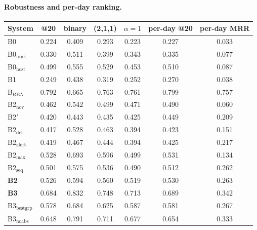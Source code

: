 \documentclass[10.5pt,a4paper]{article}
\begin{document}
\paragraph{Robustness and per-day ranking.}
\begin{center}\small
\begin{tabular}{@{}l cccccc@{}}
\toprule
System & @20 & binary & (2,1,1) & $\alpha = 1$ & per-day @20 & per-day MRR \\
\midrule
B0 & 0.224 & 0.409 & 0.293 & 0.223 & 0.227 & 0.033 \\
B0$_\mathrm{rank}$ & 0.330 & 0.511 & 0.399 & 0.343 & 0.335 & 0.077 \\
B0$_\mathrm{host}$ & 0.499 & 0.555 & 0.529 & 0.453 & 0.510 & 0.087 \\
B1 & 0.249 & 0.438 & 0.319 & 0.252 & 0.270 & 0.038 \\
B$_\mathrm{RBA}$ & 0.792 & 0.665 & 0.763 & 0.761 & 0.799 & 0.757 \\
B2$_\mathrm{nov}$ & 0.462 & 0.542 & 0.499 & 0.471 & 0.490 & 0.060 \\
B2$'$ & 0.420 & 0.443 & 0.435 & 0.425 & 0.449 & 0.209 \\
B2$_\mathrm{def}$ & 0.417 & 0.528 & 0.463 & 0.394 & 0.423 & 0.151 \\
B2$_\mathrm{alert}$ & 0.419 & 0.467 & 0.444 & 0.394 & 0.425 & 0.217 \\
B2$_\mathrm{max}$ & 0.528 & 0.693 & 0.596 & 0.499 & 0.531 & 0.134 \\
B2$_\mathrm{seq}$ & 0.501 & 0.575 & 0.536 & 0.490 & 0.512 & 0.262 \\
\textbf{B2} & 0.526 & 0.594 & 0.560 & 0.519 & 0.530 & 0.263 \\
\textbf{B3} & 0.684 & 0.832 & 0.748 & 0.713 & 0.689 & 0.342 \\
B3$_\mathrm{bestgrp}$ & 0.578 & 0.684 & 0.625 & 0.587 & 0.581 & 0.267 \\
B3$_\mathrm{noabs}$ & 0.648 & 0.791 & 0.711 & 0.677 & 0.654 & 0.333 \\
\bottomrule
\end{tabular}
\end{center}
\end{document}
